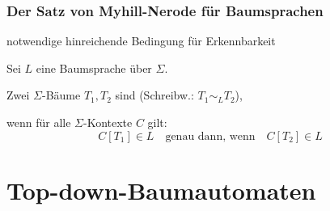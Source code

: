     \begin{frame}
      \frametitle{Der Satz von Myhill-Nerode für Baumsprachen}

       notwendige  hinreichende Bedingung für Erkennbarkeit

      \par\smallskip
      \begin{Definition}
        Sei $L$ eine Baumsprache über $\Sigma$.
        \par\smallskip
        Zwei $\Sigma$-Bäume $T_1,T_2$ sind  (Schreibw.: $T_1 \sim_L T_2$),
        \par
        wenn für alle $\Sigma$-Kontexte $C$  gilt:
        \[
          C[T_1] \in L \quad\text{genau dann, wenn}\quad C[T_2] \in L
        \]
      \end{Definition}

      \par\bigskip

      \par%
      

    \end{frame}
    

  \section[Top-down-BAs]{Top-down-Baumautomaten}

